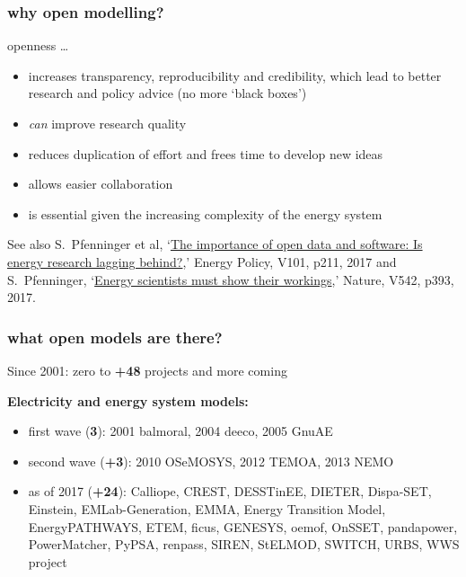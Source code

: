 \documentclass[12pt,aspectratio=169]{beamer}
\let\olditem\item
\renewcommand{\item}{%
\olditem\vspace{5pt}}
\begin{document}
\begin{frame}
  \frametitle{why open modelling?}

  openness \dots
  \begin{itemize}
  \item increases \alert{transparency}, \alert{reproducibility}
    and \alert{credibility}, which lead to better research and policy
    advice  (no more `black boxes')
  \item \emph{can} improve research \alert{quality}
  \item  reduces
    \alert{duplication of effort} and frees time  to develop
    \alert{new ideas}
  \item allows easier \alert{collaboration}
  \item is essential given the increasing \alert{complexity} of the energy system
  \end{itemize}

  \vspace{0.3cm}

  {\tiny See also  S.~Pfenninger et al, `\href{https://doi.org/10.1016/j.enpol.2016.11.046}{The importance of open data and software: Is energy research lagging behind?},' Energy Policy, V101, p211, 2017 and S.~Pfenninger, `\href{https://dx.doi.org/10.1038/542393a}{Energy scientists must show their workings},' Nature, V542, p393, 2017.}

\end{frame}







\begin{frame}
  \frametitle{what open models are there?}

  Since 2001: zero to {\bf +48} projects and more coming

  {\bf Electricity and energy system models:}
  \begin{itemize}
  \item first wave ({\bf 3}): 2001 balmoral, 2004 deeco, 2005 GnuAE
  \item second wave ({\bf +3}): 2010 OSeMOSYS, 2012 TEMOA, 2013 NEMO
   \item  as of 2017 ({\bf +24}): Calliope, CREST, DESSTinEE, DIETER, Dispa-SET, Einstein,
  EMLab-Generation, EMMA, Energy Transition Model, EnergyPATHWAYS,
  ETEM, ficus, GENESYS, oemof, OnSSET, pandapower, PowerMatcher,
  PyPSA, renpass, SIREN, StELMOD, SWITCH, URBS, WWS project
  \end{itemize}
\end{frame}
\end{document}
